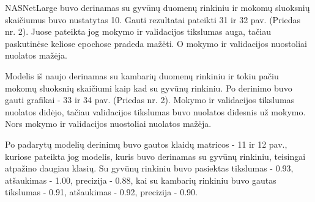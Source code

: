 \documentclass{VUMIFPSbakalaurinis}
\begin{document}
NASNetLarge buvo derinamas su gyvūnų duomenų rinkiniu ir mokomų sluoksnių skaičiumus buvo nustatytas 10.
Gauti rezultatai pateikti 31 ir 32 pav. (Priedas nr. 2). Juose pateikta jog mokymo ir validacijos tikslumas auga, tačiau paskutinėse keliose epochose pradeda mažėti. O mokymo ir validacijos nuostoliai nuolatos mažėja.

Modelis iš naujo derinamas su kambarių duomenų rinkiniu ir tokiu pačiu mokomų sluoksnių skaičiumi kaip kad su gyvūnų rinkiniu.
Po derinimo buvo gauti grafikai - 33 ir 34 pav. (Priedas nr. 2). Mokymo ir validacijos tikslumas nuolatos didėjo, tačiau validacijos tikslumas buvo nuolatos didesnis už mokymo. Nors mokymo ir validacijos nuostoliai nuolatos mažėja.

Po padarytų modelių derinimų buvo gautos klaidų matricos - 11 ir 12 pav., kuriose pateikta jog modelis, kuris buvo derinamas su gyvūnų rinkiniu, teisingai atpažino daugiau klasių.
Su gyvūnų rinkiniu buvo pasiektas tikslumas - 0.93, atšaukimas - 1.00, precizija - 0.88, kai su kambarių rinkiniu buvo gautas tikslumas - 0.91, atšaukimas - 0.92, precizija - 0.90.
\end{document}

